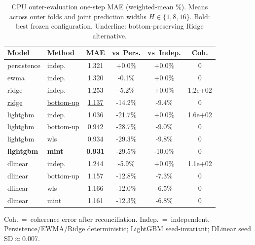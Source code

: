 \begin{table}[width=\columnwidth,pos=t]
\centering
\caption{CPU outer-evaluation one-step MAE (weighted-mean \%). Means across outer folds and joint prediction widths $H\in\{1,8,16\}$. Bold: best frozen configuration. Underline: bottom-preserving Ridge alternative.}
\label{tab:cpu_main}
\begin{threeparttable}
\small
\setlength{\tabcolsep}{2.5pt}
\begin{tabular*}{\tblwidth}{@{\extracolsep{\fill}}llcccc@{}}
\toprule
Model & Method & MAE & vs~Pers. & vs~Indep. & Coh. \\
\midrule
persistence & indep. & 1.321 & +0.0\% & +0.0\% & 0 \\
ewma & indep. & 1.320 & -0.1\% & +0.0\% & 0 \\
ridge & indep. & 1.253 & -5.2\% & +0.0\% & 1.2e+02 \\
\underline{ridge} & \underline{bottom-up} & \underline{1.137} & -14.2\% & -9.4\% & 0 \\
lightgbm & indep. & 1.036 & -21.7\% & +0.0\% & 1.6e+02 \\
lightgbm & bottom-up & 0.942 & -28.7\% & -9.0\% & 0 \\
lightgbm & wls & 0.934 & -29.3\% & -9.8\% & 0 \\
\textbf{lightgbm} & \textbf{mint} & \textbf{0.931} & -29.5\% & -10.0\% & 0 \\
dlinear & indep. & 1.244 & -5.9\% & +0.0\% & 1.1e+02 \\
dlinear & bottom-up & 1.157 & -12.8\% & -7.3\% & 0 \\
dlinear & wls & 1.166 & -12.0\% & -6.5\% & 0 \\
dlinear & mint & 1.161 & -12.3\% & -6.8\% & 0 \\
\bottomrule
\end{tabular*}
\begin{tablenotes}
\footnotesize
\item Coh.~=~coherence error after reconciliation. Indep.~=~independent.
Persistence/EWMA/Ridge deterministic; LightGBM seed-invariant; DLinear seed SD$\approx 0.007$.
\end{tablenotes}
\end{threeparttable}
\end{table}
